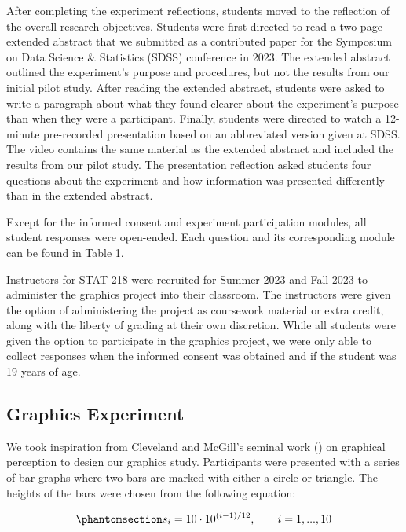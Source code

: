 \documentclass[
]{article}
\begin{document}
After completing the experiment reflections, students moved to the
reflection of the overall research objectives. Students were first
directed to read a two-page extended abstract that we submitted as a
contributed paper for the Symposium on Data Science \& Statistics (SDSS)
conference in 2023. The extended abstract outlined the experiment's
purpose and procedures, but not the results from our initial pilot
study. After reading the extended abstract, students were asked to write
a paragraph about what they found clearer about the experiment's purpose
than when they were a participant. Finally, students were directed to
watch a 12-minute pre-recorded presentation based on an abbreviated
version given at SDSS. The video contains the same material as the
extended abstract and included the results from our pilot study. The
presentation reflection asked students four questions about the
experiment and how information was presented differently than in the
extended abstract.

Except for the informed consent and experiment participation modules,
all student responses were open-ended. Each question and its
corresponding module can be found in Table 1.

Instructors for STAT 218 were recruited for Summer 2023 and Fall 2023 to
administer the graphics project into their classroom. The instructors
were given the option of administering the project as coursework
material or extra credit, along with the liberty of grading at their own
discretion. While all students were given the option to participate in
the graphics project, we were only able to collect responses when the
informed consent was obtained and if the student was 19 years of age.

\subsection{Graphics Experiment}\label{graphics-experiment}

We took inspiration from Cleveland and McGill's seminal work
() on graphical perception to design
our graphics study. Participants were presented with a series of bar
graphs where two bars are marked with either a circle or triangle. The
heights of the bars were chosen from the following equation:

\begin{equation}\phantomsection\label{eq-vals}{s_i=10\cdot 10^{(i-1)/12}, \qquad i=1,...,10}\end{equation}
\end{document}
